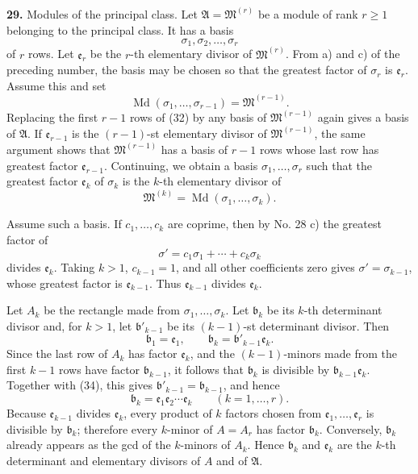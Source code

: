 \documentclass[11pt,a4paper]{article}
\begin{document}
\textbf{29.} Modules of the principal class. Let \(\mathfrak A=\mathfrak M^{(r)}\) be a module of rank \(r\ge1\) belonging to the principal class. It has a basis
\[
 \sigma_1,\sigma_2,\ldots,\sigma_r \tag{32}
\]
of \(r\) rows. Let \(\mathfrak e_r\) be the \(r\)-th elementary divisor of \(\mathfrak M^{(r)}\). From a) and c) of the preceding number, the basis may be chosen so that the greatest factor of \(\sigma_r\) is \(\mathfrak e_r\). Assume this and set
\[
 \operatorname{Md}(\sigma_1,\ldots,\sigma_{r-1})=\mathfrak M^{(r-1)}.
\]
Replacing the first \(r-1\) rows of (32) by any basis of \(\mathfrak M^{(r-1)}\) again gives a basis of \(\mathfrak A\). If \(\mathfrak e_{r-1}\) is the \((r-1)\)-st elementary divisor of \(\mathfrak M^{(r-1)}\), the same argument shows that \(\mathfrak M^{(r-1)}\) has a basis of \(r-1\) rows whose last row has greatest factor \(\mathfrak e_{r-1}\). Continuing, we obtain a basis \(\sigma_1,\ldots,\sigma_r\) such that the greatest factor \(\mathfrak e_k\) of \(\sigma_k\) is the \(k\)-th elementary divisor of
\[
 \mathfrak M^{(k)}=\operatorname{Md}(\sigma_1,\ldots,\sigma_k).
\]

Assume such a basis. If \(c_1,\ldots,c_k\) are coprime, then by No. 28 c) the greatest factor of
\[
 \sigma'=c_1\sigma_1+\cdots+c_k\sigma_k \tag{33}
\]
divides \(\mathfrak e_k\). Taking \(k>1\), \(c_{k-1}=1\), and all other coefficients zero gives \(\sigma'=\sigma_{k-1}\), whose greatest factor is \(\mathfrak e_{k-1}\). Thus \(\mathfrak e_{k-1}\) divides \(\mathfrak e_k\).

Let \(A_k\) be the rectangle made from \(\sigma_1,\ldots,\sigma_k\). Let \(\mathfrak b_k\) be its \(k\)-th determinant divisor and, for \(k>1\), let \(\mathfrak b'_{k-1}\) be its \((k-1)\)-st determinant divisor. Then
\[
 \mathfrak b_1=\mathfrak e_1,\qquad \mathfrak b_k=\mathfrak b'_{k-1}\mathfrak e_k. \tag{34}
\]
Since the last row of \(A_k\) has factor \(\mathfrak e_k\), and the \((k-1)\)-minors made from the first \(k-1\) rows have factor \(\mathfrak b_{k-1}\), it follows that \(\mathfrak b_k\) is divisible by \(\mathfrak b_{k-1}\mathfrak e_k\). Together with (34), this gives \(\mathfrak b'_{k-1}=\mathfrak b_{k-1}\), and hence
\[
 \mathfrak b_k=\mathfrak e_1\mathfrak e_2\cdots\mathfrak e_k
 \qquad(k=1,\ldots,r). \tag{35}
\]
Because \(\mathfrak e_{k-1}\) divides \(\mathfrak e_k\), every product of \(k\) factors chosen from \(\mathfrak e_1,\ldots,\mathfrak e_r\) is divisible by \(\mathfrak b_k\); therefore every \(k\)-minor of \(A=A_r\) has factor \(\mathfrak b_k\). Conversely, \(\mathfrak b_k\) already appears as the gcd of the \(k\)-minors of \(A_k\). Hence \(\mathfrak b_k\) and \(\mathfrak e_k\) are the \(k\)-th determinant and elementary divisors of \(A\) and of \(\mathfrak A\).
\end{document}
